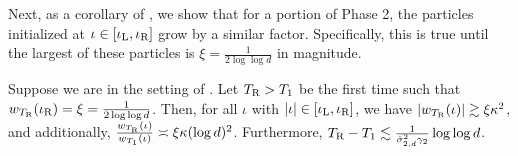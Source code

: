 Next, as a corollary of , we show that for a portion of Phase 2, the particles initialized at $\iota \in [\iota_{\textup{L}}, \iota_{\textup{R}}]$ grow by a similar factor. Specifically, this is true until the largest of these particles is $\xi = \frac{1}{2 \log \log d}$ in magnitude.

\begin{lemma}
\label{lemma:phase_2_uniform_growth_corollary}
Suppose we are in the setting of . Let ${T_{\textup{R}}} > T_1$ be the first time such that $w_{{T_{\textup{R}}}}(\iota_{\textup{R}}) = \xi = \frac{1}{2 \log \log d}$. Then, for all $\iota$ with $|\iota| \in [\iota_{\textup{L}}, \iota_{\textup{R}}]$, we have $|w_{{T_{\textup{R}}}}(\iota)| \gtrsim \xi \kappa^2$, and additionally, $\frac{w_{{T_{\textup{R}}}}(\iota)}{w_{T_1}(\iota)} \asymp \xi \kappa (\log d)^2$. Furthermore, ${T_{\textup{R}}} - T_1 \lesssim \frac{1}{\hat{\sigma}_{2, d}^2 \gamma_2} \log \log d$.
\end{lemma}
